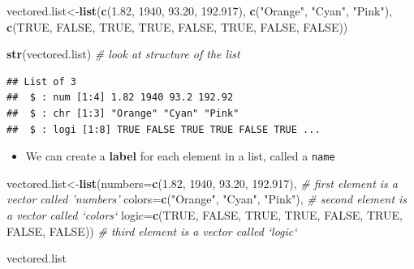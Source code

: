 \documentclass[]{book}
\newenvironment{Shaded}{\begin{snugshade}}{\end{snugshade}}
\newcommand{\KeywordTok}[1]{\textcolor[rgb]{0.13,0.29,0.53}{\textbf{#1}}}
\newcommand{\DataTypeTok}[1]{\textcolor[rgb]{0.13,0.29,0.53}{#1}}
\newcommand{\DecValTok}[1]{\textcolor[rgb]{0.00,0.00,0.81}{#1}}
\newcommand{\FloatTok}[1]{\textcolor[rgb]{0.00,0.00,0.81}{#1}}
\newcommand{\StringTok}[1]{\textcolor[rgb]{0.31,0.60,0.02}{#1}}
\newcommand{\CommentTok}[1]{\textcolor[rgb]{0.56,0.35,0.01}{\textit{#1}}}
\newcommand{\OtherTok}[1]{\textcolor[rgb]{0.56,0.35,0.01}{#1}}
\newcommand{\NormalTok}[1]{#1}
\providecommand{\tightlist}{%
  \setlength{\itemsep}{0pt}\setlength{\parskip}{0pt}}
\theoremstyle{definition}
\theoremstyle{definition}
\theoremstyle{definition}
\theoremstyle{remark}
\begin{document}
\begin{Shaded}
\begin{Highlighting}[]
\NormalTok{vectored.list<-}\KeywordTok{list}\NormalTok{(}\KeywordTok{c}\NormalTok{(}\FloatTok{1.82}\NormalTok{, }\DecValTok{1940}\NormalTok{, }\FloatTok{93.20}\NormalTok{, }\FloatTok{192.917}\NormalTok{),}
     \KeywordTok{c}\NormalTok{(}\StringTok{"Orange"}\NormalTok{, }\StringTok{"Cyan"}\NormalTok{, }\StringTok{"Pink"}\NormalTok{),}
     \KeywordTok{c}\NormalTok{(}\OtherTok{TRUE}\NormalTok{, }\OtherTok{FALSE}\NormalTok{, }\OtherTok{TRUE}\NormalTok{, }\OtherTok{TRUE}\NormalTok{, }\OtherTok{FALSE}\NormalTok{, }\OtherTok{TRUE}\NormalTok{, }\OtherTok{FALSE}\NormalTok{, }\OtherTok{FALSE}\NormalTok{))}

\KeywordTok{str}\NormalTok{(vectored.list) }\CommentTok{# look at structure of the list}
\end{Highlighting}
\end{Shaded}

\begin{verbatim}
## List of 3
##  $ : num [1:4] 1.82 1940 93.2 192.92
##  $ : chr [1:3] "Orange" "Cyan" "Pink"
##  $ : logi [1:8] TRUE FALSE TRUE TRUE FALSE TRUE ...
\end{verbatim}

\begin{itemize}
\tightlist
\item
  We can create a \textbf{label} for each element in a list, called a
  \texttt{name}
\end{itemize}

\begin{Shaded}
\begin{Highlighting}[]
\NormalTok{vectored.list<-}\KeywordTok{list}\NormalTok{(}\DataTypeTok{numbers=}\KeywordTok{c}\NormalTok{(}\FloatTok{1.82}\NormalTok{, }\DecValTok{1940}\NormalTok{, }\FloatTok{93.20}\NormalTok{, }\FloatTok{192.917}\NormalTok{), }\CommentTok{# first element is a vector called 'numbers'}
     \DataTypeTok{colors=}\KeywordTok{c}\NormalTok{(}\StringTok{"Orange"}\NormalTok{, }\StringTok{"Cyan"}\NormalTok{, }\StringTok{"Pink"}\NormalTok{), }\CommentTok{# second element is a vector called `colors`}
     \DataTypeTok{logic=}\KeywordTok{c}\NormalTok{(}\OtherTok{TRUE}\NormalTok{, }\OtherTok{FALSE}\NormalTok{, }\OtherTok{TRUE}\NormalTok{, }\OtherTok{TRUE}\NormalTok{, }\OtherTok{FALSE}\NormalTok{, }\OtherTok{TRUE}\NormalTok{, }\OtherTok{FALSE}\NormalTok{, }\OtherTok{FALSE}\NormalTok{)) }\CommentTok{# third element is a vector called `logic`}

\NormalTok{vectored.list}
\end{Highlighting}
\end{Shaded}
\end{document}

